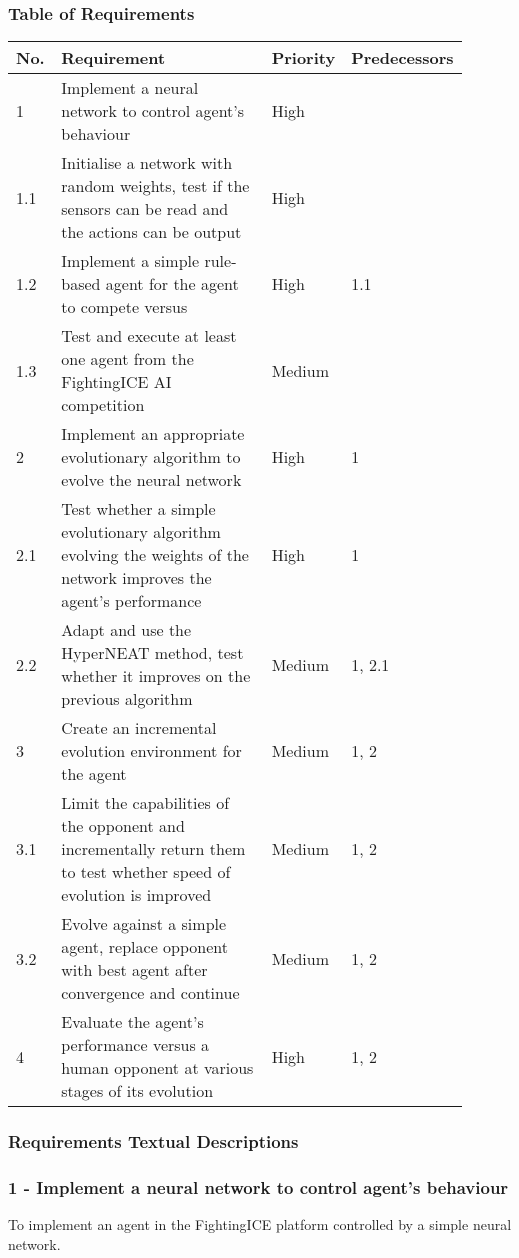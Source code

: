 \documentclass[12pt,a4paper]{article}
\begin{document}
\subsubsection{Table of Requirements}
\begin{tabular}{|p{0.1\linewidth}|p{0.5\linewidth}|p{0.1\linewidth}|p{0.2\linewidth}|}
\hline
No. & Requirement & Priority & Predecessors\\ \hline
1 & Implement a neural network to control agent's behaviour & High &\\ \hline
1.1 & Initialise a network with random weights, test if the sensors can be read and the actions can be output & High &\\ \hline
1.2 & Implement a simple rule-based agent for the agent to compete versus & High & 1.1\\ \hline
1.3 & Test and execute at least one agent from the FightingICE AI competition & Medium &\\ \hline
2 & Implement an appropriate evolutionary algorithm to evolve the neural network & High & 1\\ \hline
2.1 & Test whether a simple evolutionary algorithm evolving the weights of the network improves the agent's performance & High & 1\\ \hline
2.2 & Adapt and use the HyperNEAT method, test whether it improves on the previous algorithm & Medium & 1, 2.1\\ \hline
3 & Create an incremental evolution environment for the agent & Medium & 1, 2\\ \hline
3.1 & Limit the capabilities of the opponent and incrementally return them to test whether speed of evolution is improved & Medium & 1, 2\\ \hline
3.2 & Evolve against a simple agent, replace opponent with best agent after convergence and continue & Medium & 1, 2\\ \hline 
4 & Evaluate the agent's performance versus a human opponent at various stages of its evolution & High & 1, 2\\ \hline
\end{tabular}
\newpage
\subsubsection{Requirements Textual Descriptions}
\subsubsection*{1 - Implement a neural network to control agent's behaviour}
To implement an agent in the FightingICE platform controlled by a simple neural network.
\end{document}
